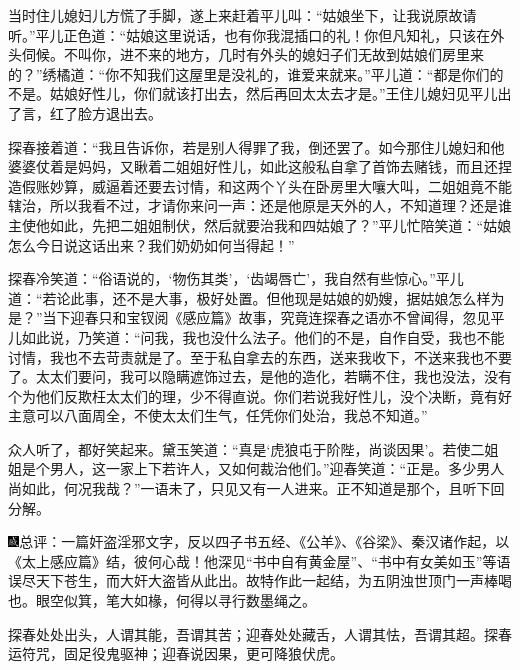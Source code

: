 当时住儿媳妇儿方慌了手脚，遂上来赶着平儿叫：``姑娘坐下，让我说原故请听。''平儿正色道：``姑娘这里说话，也有你我混插口的礼！你但凡知礼，只该在外头伺候。不叫你，进不来的地方，几时有外头的媳妇子们无故到姑娘们房里来的？''绣橘道：``你不知我们这屋里是没礼的，谁爱来就来。''平儿道：``都是你们的不是。姑娘好性儿，你们就该打出去，然后再回太太去才是。''王住儿媳妇见平儿出了言，红了脸方退出去。

探春接着道：``我且告诉你，若是别人得罪了我，倒还罢了。如今那住儿媳妇和他婆婆仗着是妈妈，又瞅着二姐姐好性儿，如此这般私自拿了首饰去赌钱，而且还捏造假账妙算，威逼着还要去讨情，和这两个丫头在卧房里大嚷大叫，二姐姐竟不能辖治，所以我看不过，才请你来问一声：还是他原是天外的人，不知道理？还是谁主使他如此，先把二姐姐制伏，然后就要治我和四姑娘了？''平儿忙陪笑道：``姑娘怎么今日说这话出来？我们奶奶如何当得起！''

探春冷笑道：``俗语说的，`物伤其类'，`齿竭唇亡'，我自然有些惊心。''平儿道：``若论此事，还不是大事，极好处置。但他现是姑娘的奶嫂，据姑娘怎么样为是？''当下迎春只和宝钗阅《感应篇》故事，究竟连探春之语亦不曾闻得，忽见平儿如此说，乃笑道：``问我，我也没什么法子。他们的不是，自作自受，我也不能讨情，我也不去苛责就是了。至于私自拿去的东西，送来我收下，不送来我也不要了。太太们要问，我可以隐瞒遮饰过去，是他的造化，若瞒不住，我也没法，没有个为他们反欺枉太太们的理，少不得直说。你们若说我好性儿，没个决断，竟有好主意可以八面周全，不使太太们生气，任凭你们处治，我总不知道。''

众人听了，都好笑起来。黛玉笑道：``真是`虎狼屯于阶陛，尚谈因果'。若使二姐姐是个男人，这一家上下若许人，又如何裁治他们。''迎春笑道：``正是。多少男人尚如此，何况我哉？''一语未了，只见又有一人进来。正不知道是那个，且听下回分解。

{\includegraphics[width=3mm]{../Images/00005}\kaishu 总评：一篇奸盗淫邪文字，反以四子书五经、《公羊》、《谷梁》、秦汉诸作起，以《太上感应篇》结，彼何心哉！他深见``书中自有黄金屋''、``书中有女美如玉''等语误尽天下苍生，而大奸大盗皆从此出。故特作此一起结，为五阴浊世顶门一声棒喝也。眼空似箕，笔大如椽，何得以寻行数墨绳之。}

{\kaishu 探春处处出头，人谓其能，吾谓其苦；迎春处处藏舌，人谓其怯，吾谓其超。探春运符咒，固足役鬼驱神；迎春说因果，更可降狼伏虎。}


